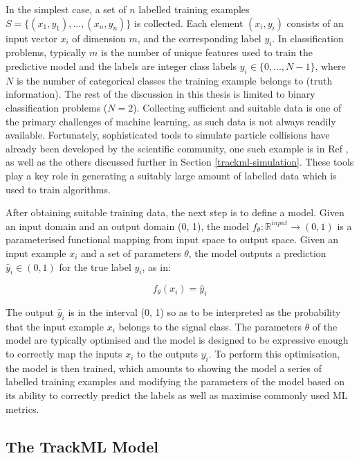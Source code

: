 In the simplest case, a set of $n$ labelled training examples $S = \{(x_1, y_1), ..., (x_n, y_n)\}$ is collected. Each element $(x_i,y_i)$ consists of an input vector $x_i$ of dimension $m$, and the corresponding label $y_i$. In classification problems, typically $m$ is the number of unique features used to train the predictive model and the labels are integer class labels $y_i \in \{0,...,N − 1\}$, where $N$ is the number of categorical classes the training example belongs to (truth information). The rest of the discussion in this thesis is limited to binary classification problems ($N = 2$). Collecting sufficient and suitable data is one of the primary challenges of machine learning, as such data is not always readily available. Fortunately, sophisticated tools to simulate particle collisions have already been developed by the scientific community, one such example is in Ref \cite{Boos:2001cv}, as well as the others discussed further in Section \ref{trackml-simulation}. These tools play a key role in generating a suitably large amount of labelled data which is used to train algorithms.

After obtaining suitable training data, the next step is to define a model. Given an input domain and an output domain (0, 1), the model $f_{\theta} : \mathbb{R}^{input} \to (0, 1)$ is a parameterised functional mapping from input space to output space. Given an input example $x_i$ and a set of parameters $\theta$, the model outputs a prediction $\hat{y}_i \in (0, 1)$ for the true label $y_i$, as in:


\begin{equation}
    f_{\theta}(x_i) = \hat{y}_i
\end{equation}

The output $\hat{y}_i$ is in the interval (0, 1) so as to be interpreted as the probability that the input example $x_i$ belongs to the signal class. The parameters $\theta$ of the model are typically optimised and the model is designed to be expressive enough to correctly map the inputs $x_i$ to the outputs $y_i$. To perform this optimisation, the model is then trained, which amounts to showing the model a series of labelled training examples and modifying the parameters of the model based on its ability to correctly predict the labels as well as maximise commonly used ML metrics.

\subsection{The TrackML Model}
\label{trackml-detector}


